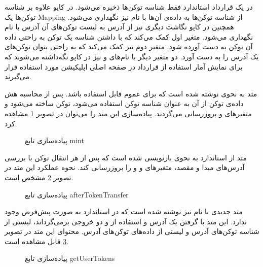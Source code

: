 در یک قرارداد
استاندارد فقط شناسه توکن‌ها ذخیره می‌شود. در کاپو علاوه بر شناسه توکن‌ها یک
\gls{Mapping}
از شناسه توکن‌ها به داده‌ی آن‌ها با نام
نیز نگهداری می‌شود. همچنین در کاپو نگاشت دیگری نیز از آدرس به لیست توکن‌های آن آدرس با نام
نگهداری می‌شود.
متغیر اول کمک می‌کند که با داشتن شناسه یک توکن به راحتی داده آن توکن به دست آورده شود.
متغیر دوم نیز کمک می‌کند که به راحتی بتوان توکن‌های یک آدرس را به دست آورد. دو متغیر دیگر با نام‌های
و
نیز در کاپو نگه‌داشته می‌شوند که برای نمایش آمار استفاده از قرارداد در صفحه اصلی اپلیکیشن مورد استفاده قرار می‌گیرند.

متد
به نحوی نوشته شده است که برای عموم قابل استفاده باشد.
پس از محاسبه هش داده‌ی توکن از آن به عنوان شناسه توکن استفاده می‌شود،
توکن ساخته می‌شود و متغیرهای
و
بروزرسانی می‌گردند.
پیاده‌سازی این متد را می‌توان در تصویر
\ref{fig:mint}
مشاهده کرد.

\begin{figure}
\centerline{}
\caption{پیاده‌سازی تابع mint}
\label{fig:mint}
\end{figure}

متد
از استاندارد
به نحوی بازنویسی
شده است که پس از هر انتقال توکن با بررسی آدرس‌های مبدا و مقصد، متغیر‌های
و
و
را بروزرسانی کند.
نحوه عملکرد این متد در تصویر
\ref{fig:afterTokenTransfer}
مشخص است.

\begin{figure}
\centerline{}
\caption{پیاده‌سازی تابع afterTokenTransfer}
\label{fig:afterTokenTransfer}
\end{figure}

متد جدیدی با نام
نیز نوشته شده است که در استاندارد
به صورت پیش‌فرض وجود ندارد. این متد با گرفتن یک آدرس و استفاده از
و
دو خروجی برمی‌گرداند، لیستی از شناسه توکن‌های آدرس و لیستی از داده‌های توکن‌های آدرس.
محتوای این متد در تصویر
\ref{fig:getUserTokens}
قابل مشاهده است.

\begin{figure}
\centerline{}
\caption{پیاده‌سازی تابع getUserTokens}
\label{fig:getUserTokens}
\end{figure}

